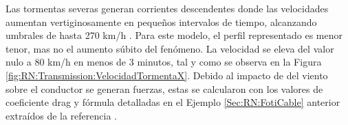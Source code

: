 \begingroup
\centering
\begin{figure}[htbp]
	\centering
	\label{fig:RN:Transmission:FuerzaTormentaX}
	\label{fig:RN:Transmission:VelocidadTormentaX}
    \label{fig:RN:Transmission:ForceVelTormentaX}
\end{figure}
\endgroup

Las tormentas severas generan corrientes descendentes donde las velocidades aumentan vertiginosamente en pequeños intervalos de tiempo, alcanzando umbrales de hasta 270 km/h \cite{fujita1985downburst}. Para este modelo, el perfil representado es menor tenor, mas no el aumento súbito del fenómeno. La velocidad se eleva del valor nulo a 80 km/h en menos de 3 minutos, tal y como se observa en la Figura \ref{fig:RN:Transmission:VelocidadTormentaX}. Debido al impacto de del viento sobre el conductor se generan fuerzas, estas se calcularon con los valores de coeficiente drag y fórmula detalladas en el Ejemplo \ref{Sec:RN:FotiCable} anterior extraídos de la referencia \textcite{Foti2016}.


